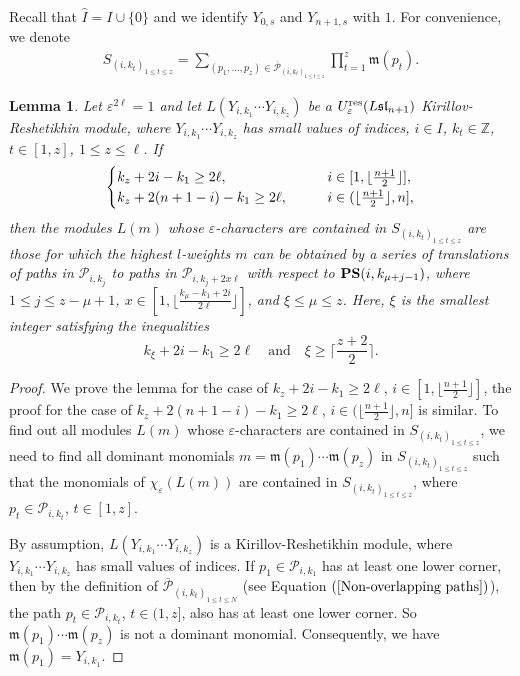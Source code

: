 \documentclass[12pt, reqno]{amsart}
\newtheorem{lemma}[theorem]{Lemma}
\numberwithin{equation}{section}
\newcommand{\ZZ}{\mathbb{Z}}
\newcommand{\res}{{\rm res}}
\begin{document}
{Recall that $\hat{I}=I \cup \{0\}$ and we identify $Y_{0,s}$ and $Y_{n+1,s}$ with $1$. For convenience, we denote
\begin{align}
S_{(i,k_t)_{1 \leq t \leq z}}=\sum_{(p_{1},\ldots,p_{z}) \in \overline{\mathscr{P}}_{(i,k_t)_{1 \leq t \leq z}}} \prod_{t=1}^{z}\mathfrak{m}(p_{t}).
\end{align}

\begin{lemma}\label{Lem: dominant monomial for k-r with z great }
Let $\varepsilon^{2 \ell}=1$ and let $L(Y_{i,k_1}\cdots Y_{i,k_z})$ be a $U_{\varepsilon}^{\res}({L\mathfrak{sl}_{n+1}})$ Kirillov-Reshetikhin module, where $Y_{i,k_1}\cdots Y_{i,k_z}$ has small values of indices, $i\in I$, $k_t\in\ZZ$, $t\in[1,z]$, $1\leq z\leq \ell$. If
\begin{align*}
\begin{cases} k_z+2i-k_1\geq 2 \ell, & {\hskip 2em} i\in [1, \lfloor \frac{n+1}2 \rfloor],\\
              k_z+2(n+1-i)-k_1\geq 2 \ell, & {\hskip 2em} i\in (\lfloor \frac{n+1}2 \rfloor, n],
\end{cases}
\end{align*}
then the modules $L(m)$ whose $\varepsilon$-characters are contained in $S_{(i,k_t)_{1 \leq t \leq z}}$ are those for which the highest $l$-weights $m$ can be obtained by a series of translations of paths in $\mathscr{P}_{i,k_j}$ to paths in $\mathscr{P}_{i,k_j+2x \ell}$ with respect to ${\bf PS}(i,k_{\mu+j-1})$, where $1\leq j\leq z-\mu+1$, $x\in[1, \lfloor\frac{k_\mu-k_1+2i}{2 \ell}\rfloor]$, and $\xi \leq \mu\leq z$. Here, $\xi$ is the smallest integer satisfying the inequalities
\[
k_\xi+2i-k_1\geq 2 \ell \quad\text{and}\quad \xi \geq \lceil \frac{z+2}2 \rceil.
\]
\end{lemma}


\begin{proof}
We prove the lemma for the case of $k_z+2i-k_1\geq 2 \ell$, $i\in [1, \lfloor \frac{n+1}2 \rfloor ]$, the proof for the case of $k_z+2(n+1-i)-k_1\geq 2 \ell$, $i\in (\lfloor \frac{n+1}2 \rfloor, n ]$ is similar. To find out all modules $L(m)$ whose $\varepsilon$-characters are contained in $S_{(i,k_t)_{1 \leq t \leq z}}$, we need to find all dominant monomials $m=\mathfrak{m}(p_1)\cdots \mathfrak{m}(p_z)$ in $S_{(i,k_t)_{1 \leq t \leq z}}$ such that the monomials of $\chi_{\varepsilon}(L(m))$ are contained in $S_{(i,k_t)_{1 \leq t \leq z}}$, where $p_t \in \mathscr{P}_{i,k_t}$, $t\in[1,z]$.

By assumption, $L(Y_{i,k_1}\cdots Y_{i,k_z})$ is a Kirillov-Reshetikhin module, where $Y_{i,k_1}\cdots Y_{i,k_z}$ has small values of indices. If $p_1 \in \mathscr{P}_{i,k_1}$ has at least one lower corner, then by the definition of $\overline{\mathscr{P}}_{(i,k_{t})_{1\leq t\leq N}}$ (see Equation $(\ref{Non-overlapping paths})$), the path $p_t \in \mathscr{P}_{i,k_t}$, $t\in(1,z]$, also has at least one lower corner. So $\mathfrak{m}(p_1)\cdots \mathfrak{m}(p_z)$ is not a dominant monomial. Consequently, we have $\mathfrak{m}(p_1)=Y_{i,k_1}$.



\end{proof}}
\end{document}
